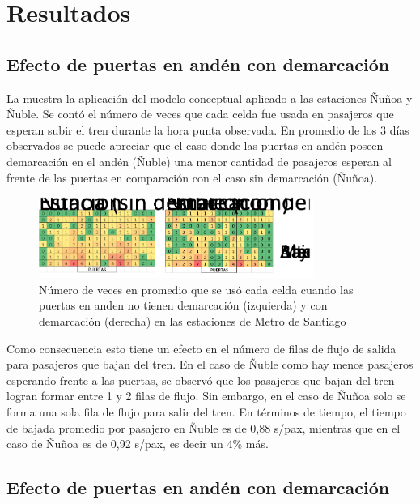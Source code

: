 \section{Resultados}
\label{sec:4}

\subsection{Efecto de puertas en andén con demarcación}
\label{sec:4.1}
La  muestra la aplicación del modelo conceptual aplicado a las estaciones Ñuñoa y Ñuble. Se contó el número de veces que cada celda fue usada en pasajeros que esperan subir el tren durante la hora punta observada. En promedio de los 3 días observados se puede apreciar que el caso donde las puertas en andén poseen demarcación en el andén (Ñuble) una menor cantidad de pasajeros esperan al frente de las puertas en comparación con el caso sin demarcación (Ñuñoa). 

\begin{figure}
    \centering
    \includegraphics[width=0.8\textwidth]{imagenes/ilustracion_5.png}
    \caption{Número de veces en promedio que se usó cada celda cuando las puertas en anden no tienen demarcación (izquierda) y con demarcación (derecha) en las estaciones de Metro de Santiago}\label{fig5}
\end{figure}

Como consecuencia esto tiene un efecto en el número de filas de flujo de salida para pasajeros que bajan del tren. En el caso de Ñuble como hay menos pasajeros esperando frente a las puertas, se observó que los pasajeros que bajan del tren logran formar entre 1 y 2 filas de flujo. Sin embargo, en el caso de Ñuñoa solo se forma una sola fila de flujo para salir del tren. En términos de tiempo, el tiempo de bajada promedio por pasajero en Ñuble es de 0,88 s/pax, mientras que en el caso de Ñuñoa es de 0,92 s/pax, es decir un 4\% más.


\subsection{Efecto de puertas en andén con demarcación}
\label{sec:4.2}

